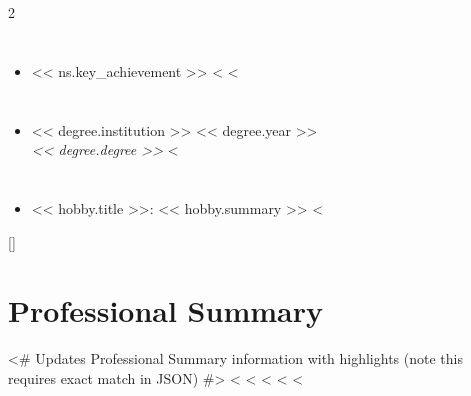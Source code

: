 \documentclass[letterpaper,11pt]{article}
\newcommand{\sectionSpacing}{\vspace{5pt}}
\newcommand{\medbold}[1]{{\fontseries{100}\selectfont #1}} %
\newcommand{\leftSection}[1]{
  \section{\color{leftpaneltext}{#1}}
}
\newcommand{\listStart}{\begin{itemize}[leftmargin=0.0in, label={}]}
\newcommand{\listItem}[2]{\item{#2 {#1}}}
\newcommand{\listEnd}{\end{itemize}}
\newcommand{\genericListItem}[1]{\listItem{#1}{}}
\newcommand{\positiveBolding}[1]{\medbold{\color{mediumgray}{#1}}}
\begin{document}
\begin{paracol}{2}
\sectionSpacing


\leftSection{Key Achievements}
  \listStart
   <%
    <%
      <%
      <%
        <%
        <%
      <%
      \genericListItem{ << ns.key_achievement >> }
     <%
   <%
  \listEnd
\sectionSpacing


\leftSection{Education \& Certifications}
  \listStart
   <%
     \genericListItem{\medbold{ << degree.institution >> } { << degree.year >> } \\ 
     \textit{ << degree.degree >> }}
   <%
  \listEnd
\sectionSpacing


\leftSection{Interest \& Hobbies}
  \listStart
   <%
    \genericListItem{\medbold{<< hobby.title >>:} << hobby.summary >>}
   <%
  \listEnd

\switchcolumn



\titleformat{\section}{\vspace{-4pt}\raggedright\large\bfseries\color{darkgray}}{}{0em}{}[\titlerule\vspace{-5pt}]


\section{Professional Summary}

<# Updates Professional Summary information with highlights (note this requires exact match in JSON) #>
<%
<%
    <%
    <%
<%

\small\color{darkgray}{<< ps.summary >>}
\sectionSpacing


\end{paracol}
\end{document}
